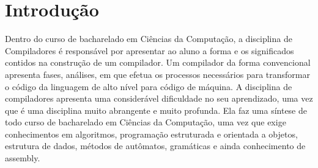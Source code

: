 \documentclass[12pt,oneside,a4paper,chapter=TITLE,section=TITLE,sumario=tradicional]{abntex2}
\begin{document}


\listadefiguras

\listadegraficos
\listadequadros

\sumario

\textual

\chapter{Introdução}
\label{cap:introducao}


Dentro do curso de bacharelado em Ciências da Computação, a disciplina de Compiladores é responsável por apresentar ao aluno a forma e os significados contidos na construção de um compilador. Um compilador da forma convencional apresenta fases, análises, em que efetua os processos necessários para transformar o código da linguagem de alto nível para código de máquina. A disciplina de compiladores apresenta uma considerável dificuldade no seu aprendizado, uma vez que é uma disciplina muito abrangente e muito profunda. Ela faz uma síntese de todo curso de bacharelado em Ciências da Computação, uma vez que exige conhecimentos em algoritmos, programação estruturada e orientada a objetos, estrutura de dados, métodos de autômatos, gramáticas e ainda conhecimento de assembly. 
\end{document}
